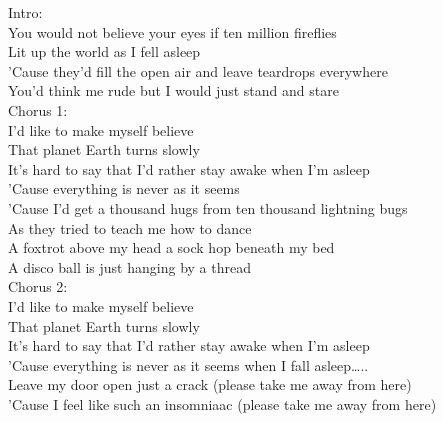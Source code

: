 Intro:            \\
 You would not believe your eyes  if ten million fireflies\\
 Lit up the  world as I fell asleep\\
 'Cause they'd fill the  open air  and leave teardrops everywhere\\
You'd  think me rude but  I would just stand and  stare\\
Chorus 1: \\
 I'd like to  make myself believe\\
That planet  Earth  turns  slowly\\
It's  hard to say that I'd  rather stay awake when  I'm asleep\\
'Cause  everything is  never as it  seems\\
 'Cause I'd get a  thousand hugs  from ten thousand lightning bugs\\
 As they tried to  teach me how to  dance\\
 A foxtrot above my head  a sock hop beneath my bed\\
A  disco ball is just  hanging by a  thread\\
Chorus 2:\\
 I'd like to  make myself believe\\
That planet  Earth  turns  slowly\\
It's  hard to say that I'd  rather stay awake when  I'm asleep\\
'Cause  everything is  never as it  seems when I fall asleep…..\\
 Leave my door  open just a  crack (please take me away from  here)\\
'Cause I feel like  such an insomniaac (please take me away from  here)\\
